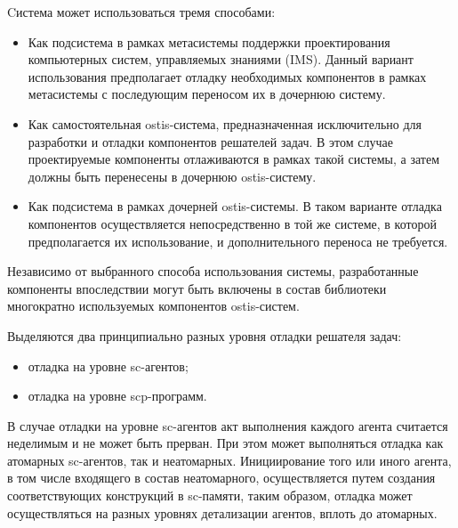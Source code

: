 



Cистема может использоваться тремя способами:
\begin{itemize}
    \item Как подсистема в рамках метасистемы поддержки проектирования компьютерных систем, управляемых знаниями (IMS). Данный вариант использования предполагает отладку необходимых компонентов в рамках метасистемы с последующим переносом их в дочернюю систему.
    \item Как самостоятельная ostis-система, предназначенная исключительно для разработки и отладки компонентов решателей задач. В этом случае проектируемые компоненты отлаживаются в рамках такой системы, а затем должны быть перенесены в дочернюю ostis-систему.
    \item Как подсистема в рамках дочерней ostis-системы. В таком варианте отладка компонентов осуществляется непосредственно в той же системе, в которой предполагается их использование, и дополнительного переноса не требуется.
\end{itemize}

Независимо от выбранного способа использования системы, разработанные компоненты впоследствии могут быть включены в состав библиотеки многократно используемых компонентов ostis-систем.

Выделяются два принципиально разных уровня отладки решателя задач:
\begin{itemize}
    \item отладка на уровне sc-агентов;
    \item отладка на уровне scp-программ.
\end{itemize}

В случае отладки на уровне sc-агентов акт выполнения каждого агента считается неделимым и не может быть прерван. При этом может выполняться отладка как атомарных sc-агентов, так и неатомарных. Инициирование того или иного агента, в том числе входящего в состав неатомарного, осуществляется путем создания соответствующих конструкций в sc-памяти, таким образом, отладка может осуществляться на разных уровнях детализации агентов, вплоть до атомарных.

